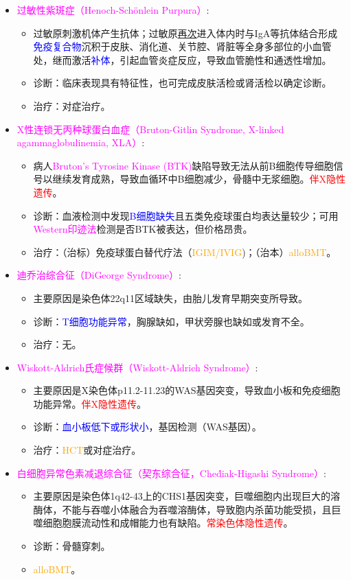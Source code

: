 \documentclass[UTF8]{book}
\newcommand{\concept}[1]{\textcolor{magenta}{#1}}
\newcommand{\drug}[1]{\textcolor{orange}{#1}}
\newcommand{\imp}[1]{\textcolor{red}{#1}}
\renewcommand{\emph}[1]{\textcolor{blue}{#1}}
\begin{document}
\begin{itemize}
\begin{itemize}
\end{itemize}
\item \concept{过敏性紫斑症（Henoch-Sch\"onlein Purpura）}:
\begin{itemize}
	\item 过敏原刺激机体产生抗体；过敏原\uline{再次}进入体内时与IgA等抗体结合形成\emph{免疫复合物}沉积于皮肤、消化道、关节腔、肾脏等全身多部位的小血管处，继而激活\emph{补体}，引起血管炎症反应，导致血管脆性和通透性增加。
	\item 诊断：临床表现具有特征性，也可完成皮肤活检或肾活检以确定诊断。
	\item 治疗：对症治疗。
\end{itemize}
\item \concept{X性连锁无丙种球蛋白血症（Bruton-Gitlin Syndrome, X-linked agammaglobulinemia, XLA）}:
\begin{itemize}
	\item 病人\concept{Bruton's Tyrosine Kinase (BTK)}缺陷导致无法从前B细胞传导细胞信号以继续发育成熟，导致血循环中B细胞减少，骨髓中无浆细胞。\imp{伴X隐性遗传}。
	\item 诊断：血液检测中发现\emph{B细胞缺失}且五类免疫球蛋白均表达量较少；可用\concept{Western印迹法}检测是否BTK被表达，但价格昂贵。
	\item 治疗：（治标）免疫球蛋白替代疗法（\drug{IGIM/IVIG})；（治本）\drug{alloBMT}。
\end{itemize}
\item \concept{迪乔治综合征（DiGeorge Syndrome）}:
\begin{itemize}
	\item 主要原因是染色体22q11区域缺失，由胎儿发育早期突变所导致。
	\item 诊断：\emph{T细胞功能异常}，胸腺缺如，甲状旁腺也缺如或发育不全。
	\item 治疗：无。
\end{itemize}
\item \concept{Wiskott-Aldrich氏症候群（Wiskott-Aldrich Syndrome）}:
\begin{itemize}
	\item 主要原因是X染色体p11.2-11.23的WAS基因突变，导致血小板和免疫细胞功能异常。\imp{伴X隐性遗传}。
	\item 诊断：\emph{血小板低下或形状小}，基因检测（WAS基因）。
	\item 治疗：\drug{HCT}或对症治疗。
\end{itemize}
\item \concept{白细胞异常色素减退综合征（契东综合征，Che\'diak-Higashi Syndrome）}:
\begin{itemize}
	\item 主要原因是染色体1q42-43上的CHS1基因突变，巨噬细胞内出现巨大的溶酶体，不能与吞噬小体融合为吞噬溶酶体，导致胞内杀菌功能受损，且巨噬细胞胞膜流动性和成帽能力也有缺陷。\imp{常染色体隐性遗传}。
	\item 诊断：骨髓穿刺。
	\item \drug{alloBMT}。
\end{itemize}
\end{itemize}
\end{document}
